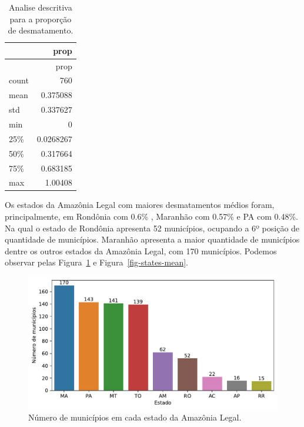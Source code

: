 \documentclass[
]{article}
\begin{document}
\hypertarget{tbl-descritiva}{}
\begin{longtable}[]{@{}lr@{}}
\caption{\label{tbl-descritiva}Analise descritiva para a proporção de
desmatamento.}\tabularnewline
\toprule()
& prop \\
\midrule()
\endfirsthead
\toprule()
& prop \\
\midrule()
\endhead
count & 760 \\
mean & 0.375088 \\
std & 0.337627 \\
min & 0 \\
25\% & 0.0268267 \\
50\% & 0.317664 \\
75\% & 0.683185 \\
max & 1.00408 \\
\bottomrule()
\end{longtable}

Os estados da Amazônia Legal com maiores desmatamentos médios foram,
principalmente, em Rondônia com 0.6\% , Maranhão com 0.57\% e PA com
0.48\%. Na qual o estado de Rondônia apresenta 52 municípios, ocupando a
6º posição de quantidade de municípios. Maranhão apresenta a maior
quantidade de municípios dentre os outros estados da Amazônia Legal, com
170 municípios. Podemos observar pelas Figura~\ref{fig-num-city} e
Figura~\ref{fig-states-mean}.

\begin{figure}[H]

{\centering \includegraphics{report_files/figure-pdf/fig-num-city-output-1.pdf}

}

\caption{\label{fig-num-city}Número de municípios em cada estado da
Amazônia Legal.}

\end{figure}
\end{document}
